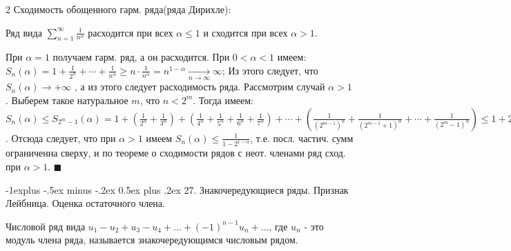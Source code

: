 \documentclass[unicode,10pt, landscape]{article}
\makeatletter
\renewcommand{\subsection}{\@startsection{subsection}{2}{0mm}%
                                {-1explus -.5ex minus -.2ex}%
                                {0.5ex plus .2ex}%
                                {\normalfont\normalsize\bfseries}}
\newenvironment{Proof} %
{\par\noindent{\bf Док-во:}} %
{\hfill$\scriptstyle\blacksquare$}
\makeatother
\begin{document}
\begin{multicols}{2}
Сходимость обощенного гарм. ряда(ряда Дирихле):
\begin{Th}
Ряд вида $\sum_{n = 1}^{\infty}\frac{1}{n^\alpha}$ расходится при всех $\alpha \leq 1$ и сходится при всех $\alpha > 1$.
\begin{Proof}
При $\alpha=1$ получаем гарм. ряд, а он расходится. При $0<\alpha<1$ имеем: $S_{n}(\alpha)=1+ \frac{1}{2^{\alpha}}+\cdots +\frac{1}{n^{\alpha}}\geq n \cdot \frac{1}{n^{\alpha}}=n^{1-\alpha}\underset{n\rightarrow \infty }{\rightarrow}\infty$; Из этого следует, что $S_{n}(\alpha)\rightarrow +\infty$ , а из этого следует расходимость ряда. Рассмотрим случай $\alpha>1$. Выберем такое натуральное $m$, что $n<2^{m}$. Тогда имеем: $S_{n}(\alpha)\leq S_{2^{m}-1}(\alpha)=1+\left ( \frac{1}{2^{\alpha}}+\frac{1}{3^{\alpha}} \right )+\left ( \frac{1}{4^{\alpha}}+\frac{1}{5^{\alpha}}+\frac{1}{6^{\alpha}}+\frac{1}{7^{\alpha}} \right )+ \cdots +\left ( \frac{1}{(2^{m-1})^{\alpha}}+\frac{1}{(2^{m-1}+1)^{\alpha}}+\cdots +\frac{1}{(2^{m}-1)^{\alpha}} \right )\leq 1+2^{1-\alpha}+(2^{2})^{1-\alpha}+\cdots +(2^{m-1})^{1-\alpha}=1+2^{1-\alpha}+(2^{1-\alpha})^{2}+\cdots +(2^{1-\alpha})^{m-1}=\frac{1-(2^{1-\alpha})^{m}}{1-2^{1-\alpha}}$. Отсюда следует, что при $\alpha>1$ имеем $S_{n}(\alpha)\leq \frac{1}{1-2^{1-\alpha}}$, т.е. посл. частич. сумм ограниченна сверху, и по теореме о сходимости рядов с неот. членами ряд сход. при $\alpha>1$.
\end{Proof}
\end{Th}


\subsection{27. Знакочередующиеся ряды. Признак Лейбница. Оценка остаточного члена.}
\begin{Def}
Числовой ряд вида $u_{1}-u_2+u_3-u_4+...+(-1)^{n-1}u_n+...$, где $u_n$ - это модуль члена ряда, называется знакочередующимся числовым рядом.
\end{Def}


\end{multicols}
\end{document}
